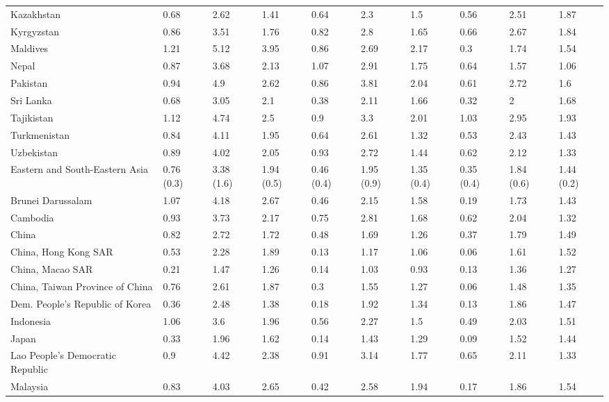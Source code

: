 \begin{longtable}[t]{llllllllll}
Kazakhstan & 0.68 & 2.62 & 1.41 & 0.64 & 2.3 & 1.5 & 0.56 & 2.51 & 1.87\\
\addlinespace
Kyrgyzstan & 0.86 & 3.51 & 1.76 & 0.82 & 2.8 & 1.65 & 0.66 & 2.67 & 1.84\\
Maldives & 1.21 & 5.12 & 3.95 & 0.86 & 2.69 & 2.17 & 0.3 & 1.74 & 1.54\\
Nepal & 0.87 & 3.68 & 2.13 & 1.07 & 2.91 & 1.75 & 0.64 & 1.57 & 1.06\\
Pakistan & 0.94 & 4.9 & 2.62 & 0.86 & 3.81 & 2.04 & 0.61 & 2.72 & 1.6\\
Sri Lanka & 0.68 & 3.05 & 2.1 & 0.38 & 2.11 & 1.66 & 0.32 & 2 & 1.68\\
\addlinespace
Tajikistan & 1.12 & 4.74 & 2.5 & 0.9 & 3.3 & 2.01 & 1.03 & 2.95 & 1.93\\
Turkmenistan & 0.84 & 4.11 & 1.95 & 0.64 & 2.61 & 1.32 & 0.53 & 2.43 & 1.43\\
Uzbekistan & 0.89 & 4.02 & 2.05 & 0.93 & 2.72 & 1.44 & 0.62 & 2.12 & 1.33\\
Eastern and South-Eastern Asia & 0.76 (0.3) & 3.38 (1.6) & 1.94 (0.5) & 0.46 (0.4) & 1.95 (0.9) & 1.35 (0.4) & 0.35 (0.4) & 1.84 (0.6) & 1.44 (0.2)\\
Brunei Darussalam & 1.07 & 4.18 & 2.67 & 0.46 & 2.15 & 1.58 & 0.19 & 1.73 & 1.43\\
\addlinespace
Cambodia & 0.93 & 3.73 & 2.17 & 0.75 & 2.81 & 1.68 & 0.62 & 2.04 & 1.32\\
China & 0.82 & 2.72 & 1.72 & 0.48 & 1.69 & 1.26 & 0.37 & 1.79 & 1.49\\
China, Hong Kong SAR & 0.53 & 2.28 & 1.89 & 0.13 & 1.17 & 1.06 & 0.06 & 1.61 & 1.52\\
China, Macao SAR & 0.21 & 1.47 & 1.26 & 0.14 & 1.03 & 0.93 & 0.13 & 1.36 & 1.27\\
China, Taiwan Province of China & 0.76 & 2.61 & 1.87 & 0.3 & 1.55 & 1.27 & 0.06 & 1.48 & 1.35\\
\addlinespace
Dem. People's Republic of Korea & 0.36 & 2.48 & 1.38 & 0.18 & 1.92 & 1.34 & 0.13 & 1.86 & 1.47\\
Indonesia & 1.06 & 3.6 & 1.96 & 0.56 & 2.27 & 1.5 & 0.49 & 2.03 & 1.51\\
Japan & 0.33 & 1.96 & 1.62 & 0.14 & 1.43 & 1.29 & 0.09 & 1.52 & 1.44\\
Lao People's Democratic Republic & 0.9 & 4.42 & 2.38 & 0.91 & 3.14 & 1.77 & 0.65 & 2.11 & 1.33\\
Malaysia & 0.83 & 4.03 & 2.65 & 0.42 & 2.58 & 1.94 & 0.17 & 1.86 & 1.54\\

\end{longtable}
